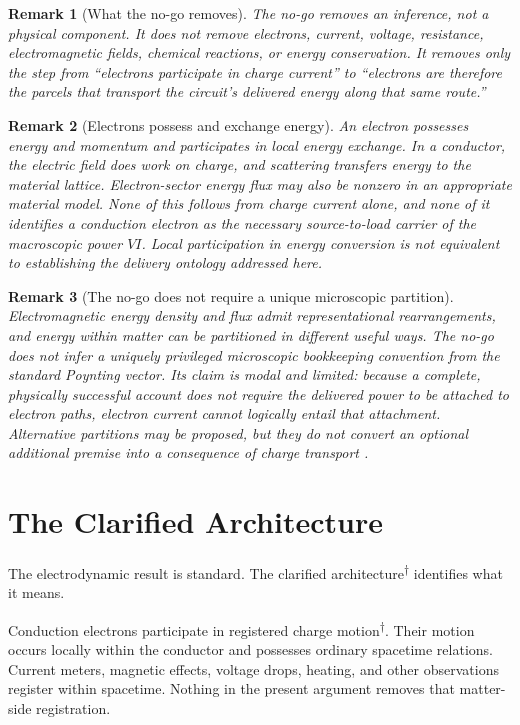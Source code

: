 \documentclass[12pt,onecolumn]{article}
\newcommand{\defterm}[2]{#1\textsuperscript{\textcolor{gray}{\hyperref[#2]{\scriptsize$\dagger$}}}}
\newtheorem{remark}{Remark}
\begin{document}
\begin{remark}[What the no-go removes]
The no-go removes an inference, not a physical component. It does not remove electrons, current, voltage, resistance, electromagnetic fields, chemical reactions, or energy conservation. It removes only the step from ``electrons participate in charge current'' to ``electrons are therefore the parcels that transport the circuit's delivered energy along that same route.''
\end{remark}

\begin{remark}[Electrons possess and exchange energy]
An electron possesses energy and momentum and participates in local energy exchange. In a conductor, the electric field does work on charge, and scattering transfers energy to the material lattice. Electron-sector energy flux may also be nonzero in an appropriate material model. None of this follows from charge current alone, and none of it identifies a conduction electron as the necessary source-to-load carrier of the macroscopic power $VI$. Local participation in energy conversion is not equivalent to establishing the delivery ontology addressed here.
\end{remark}

\begin{remark}[The no-go does not require a unique microscopic partition]
Electromagnetic energy density and flux admit representational rearrangements, and energy within matter can be partitioned in different useful ways. The no-go does not infer a uniquely privileged microscopic bookkeeping convention from the standard Poynting vector. Its claim is modal and limited: because a complete, physically successful account does not require the delivered power to be attached to electron paths, electron current cannot logically entail that attachment. Alternative partitions may be proposed, but they do not convert an optional additional premise into a consequence of charge transport \cite{feynman}.
\end{remark}


\section{The Clarified Architecture}

The electrodynamic result is standard. The \defterm{clarified architecture}{def:clarifiedarchitecture} identifies what it means.

Conduction electrons participate in \defterm{registered charge motion}{def:registeredmotion}. Their motion occurs locally within the conductor and possesses ordinary spacetime relations. Current meters, magnetic effects, voltage drops, heating, and other observations register within spacetime. Nothing in the present argument removes that matter-side registration.
\end{document}
